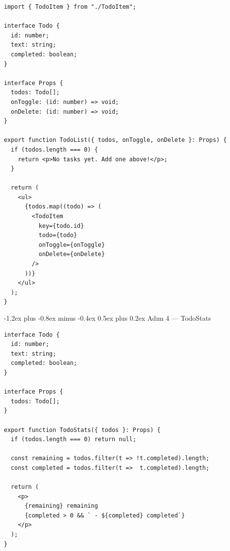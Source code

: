 \documentclass[12pt, a4paper]{article}
\makeatletter
\renewcommand{\subsection}{%
  \@startsection{subsection}{2}{\z@}%
    {-1.2ex plus -0.8ex minus -0.4ex}%
    {0.5ex plus 0.2ex}%
    {\normalfont\large\bfseries\sffamily\color{secondary}}%
}
\makeatother
\begin{document}
\vspace{6pt}

\begin{tcolorbox}[enhanced, colback=codebg, colframe=gray!30,
    colbacktitle=primary!85!black, coltitle=white, arc=4pt,
    title={\sffamily\bfseries\small src/components/TodoList.tsx}]
\begin{lstlisting}[style=jsxstyle]
import { TodoItem } from "./TodoItem";

interface Todo {
  id: number;
  text: string;
  completed: boolean;
}

interface Props {
  todos: Todo[];
  onToggle: (id: number) => void;
  onDelete: (id: number) => void;
}

export function TodoList({ todos, onToggle, onDelete }: Props) {
  if (todos.length === 0) {
    return <p>No tasks yet. Add one above!</p>;
  }

  return (
    <ul>
      {todos.map((todo) => (
        <TodoItem
          key={todo.id}
          todo={todo}
          onToggle={onToggle}
          onDelete={onDelete}
        />
      ))}
    </ul>
  );
}
\end{lstlisting}
\end{tcolorbox}

\newpage
\subsection{Adım 4 --- TodoStats}

\begin{tcolorbox}[enhanced, colback=codebg, colframe=gray!30,
    colbacktitle=primary!85!black, coltitle=white, arc=4pt,
    title={\sffamily\bfseries\small src/components/TodoStats.tsx}]
\begin{lstlisting}[style=jsxstyle]
interface Todo {
  id: number;
  text: string;
  completed: boolean;
}

interface Props {
  todos: Todo[];
}

export function TodoStats({ todos }: Props) {
  if (todos.length === 0) return null;

  const remaining = todos.filter(t => !t.completed).length;
  const completed = todos.filter(t =>  t.completed).length;

  return (
    <p>
      {remaining} remaining
      {completed > 0 && ` - ${completed} completed`}
    </p>
  );
}
\end{lstlisting}
\end{tcolorbox}
\end{document}

